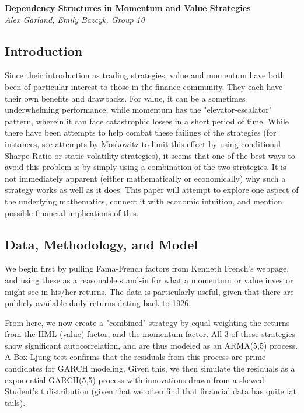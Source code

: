 \documentclass[12pt,letterpaper]{memoir}
\begin{document}
    \vspace*{-50pt}
    \begin{center}
    	\textbf{{\large Dependency Structures in Momentum and Value Strategies}}
    	\\
    	\textit{Alex Garland, Emily Bazcyk, Group 10}
    \end{center}
    
\subsection*{Introduction}
Since their introduction as trading strategies, value and momentum have both been of particular interest to those in the finance community. They each have their own benefits and drawbacks. For value, it can be a sometimes underwhelming performance, while momentum has the "elevator-escalator" pattern, wherein it can face catastrophic losses in a short period of time. While there have been attempts to help combat these failings of the strategies (for instances, see attempts by Moskowitz to limit this effect by using conditional Sharpe Ratio or static volatility strategies), it seems that one of the best ways to avoid this problem is by simply using a combination of the two strategies. It is not immediately apparent (either mathematically or economically) why such a strategy works as well as it does. This paper will attempt to explore one aspect of the underlying mathematics, connect it with economic intuition, and mention possible financial implications of this.
\subsection*{Data, Methodology, and Model}
We begin first by pulling Fama-French factors from Kenneth French's webpage, and using these as a reasonable stand-in for what a momentum or value investor might see in his/her returns. The data is particularly useful, given that there are publicly available daily returns dating back to 1926.

From here, we now create a "combined" strategy by equal weighting the returns from the HML (value) factor, and the momentum factor. All 3 of these strategies show significant autocorrelation, and are thus modeled as an ARMA(5,5) process. A Box-Ljung test confirms that the residuals from this process are prime candidates for GARCH modeling. Given this, we then simulate the residuals as a exponential GARCH(5,5) process with innovations drawn from a skewed Student's t distribution (given that we often find that financial data has quite fat tails).
\end{document}
